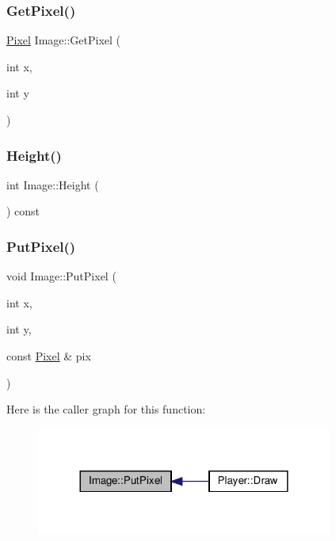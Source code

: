 \subsubsection{\texorpdfstring{Get\+Pixel()}{GetPixel()}}
{\footnotesize\ttfamily \hyperlink{structPixel}{Pixel} Image\+::\+Get\+Pixel (\begin{DoxyParamCaption}\item[{int}]{x,  }\item[{int}]{y }\end{DoxyParamCaption})\hspace{0.3cm}{\ttfamily [inline]}}

\mbox{\label{structImage_a617543a57fd7abf1a4a052539fe35807}} 
\subsubsection{\texorpdfstring{Height()}{Height()}}
{\footnotesize\ttfamily int Image\+::\+Height (\begin{DoxyParamCaption}{ }\end{DoxyParamCaption}) const\hspace{0.3cm}{\ttfamily [inline]}}

\mbox{\label{structImage_ad728f53861c64498690a311abe1667c4}} 
\subsubsection{\texorpdfstring{Put\+Pixel()}{PutPixel()}}
{\footnotesize\ttfamily void Image\+::\+Put\+Pixel (\begin{DoxyParamCaption}\item[{int}]{x,  }\item[{int}]{y,  }\item[{const \hyperlink{structPixel}{Pixel} \&}]{pix }\end{DoxyParamCaption})\hspace{0.3cm}{\ttfamily [inline]}}

Here is the caller graph for this function\+:
\nopagebreak
\begin{figure}[H]
\begin{center}
\leavevmode
\includegraphics[width=276pt]{structImage_ad728f53861c64498690a311abe1667c4_icgraph}
\end{center}
\end{figure}
\mbox{\label{structImage_a4cb69c5911f1f8e4944047825dcf117c}} 
